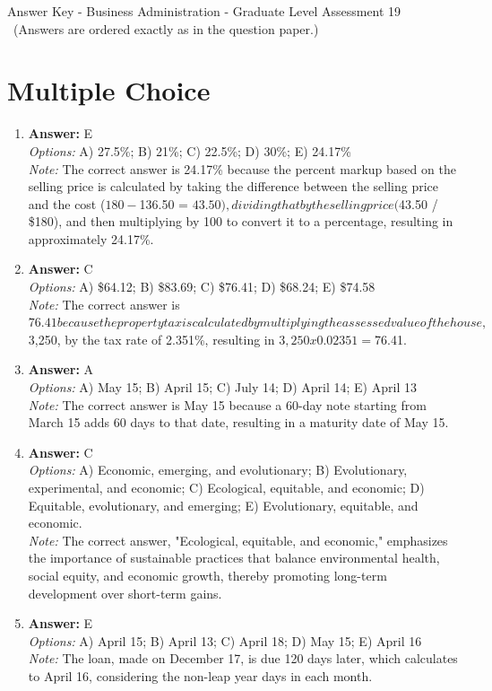 \documentclass[12pt]{article}
\begin{document}
\begin{center}
Answer Key - Business Administration - Graduate Level Assessment 19 \
\small (Answers are ordered exactly as in the question paper.)
\end{center}

\section*{Multiple Choice}
\begin{enumerate}[label=\arabic*.]
\item \textbf{Answer:} E
\\ \textit{Options:} A) 27.5\%; B) 21\%; C) 22.5\%; D) 30\%; E) 24.17\%
\\ \textit{Note:} The correct answer is 24.17\% because the percent markup based on the selling price is calculated by taking the difference between the selling price and the cost ($180 - $136.50 = $43.50), dividing that by the selling price ($43.50 / \$180), and then multiplying by 100 to convert it to a percentage, resulting in approximately 24.17\%.
\item \textbf{Answer:} C
\\ \textit{Options:} A) \$64.12; B) \$83.69; C) \$76.41; D) \$68.24; E) \$74.58
\\ \textit{Note:} The correct answer is $76.41 because the property tax is calculated by multiplying the assessed value of the house, $3,250, by the tax rate of 2.351\%, resulting in $3,250 x 0.02351 = $76.41.
\item \textbf{Answer:} A
\\ \textit{Options:} A) May 15; B) April 15; C) July 14; D) April 14; E) April 13
\\ \textit{Note:} The correct answer is May 15 because a 60-day note starting from March 15 adds 60 days to that date, resulting in a maturity date of May 15.
\item \textbf{Answer:} C
\\ \textit{Options:} A) Economic, emerging, and evolutionary; B) Evolutionary, experimental, and economic; C) Ecological, equitable, and economic; D) Equitable, evolutionary, and emerging; E) Evolutionary, equitable, and economic.
\\ \textit{Note:} The correct answer, "Ecological, equitable, and economic," emphasizes the importance of sustainable practices that balance environmental health, social equity, and economic growth, thereby promoting long-term development over short-term gains.
\item \textbf{Answer:} E
\\ \textit{Options:} A) April 15; B) April 13; C) April 18; D) May 15; E) April 16
\\ \textit{Note:} The loan, made on December 17, is due 120 days later, which calculates to April 16, considering the non-leap year days in each month.
\end{enumerate}
\end{document}
